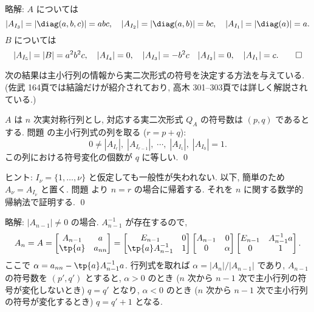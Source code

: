 \documentclass[12pt,twoside]{jarticle}
\newcommand\commentout[1]{#1}
\newcommand\commentout[1]{}
\begin{document}
\commentout{
\noindent
略解: $A$ については
\begin{equation*}
  |A_{I_3}|=|\diag(a,b,c)|=abc, \quad
  |A_{I_2}|=|\diag(a,b)|=bc, \quad
  |A_{I_1}|=|\diag(a)|=a.
\end{equation*}
$B$ については
\begin{equation*}
  |A_{I_5}|=|B|=a^2b^2c, \quad
  |A_{I_4}|=0, \quad
  |A_{I_3}|=-b^2c \quad
  |A_{I_2}|=0, \quad
  |A_{I_1}|=c.
\qed
\end{equation*}
}

\medskip

次の結果は主小行列の情報から実二次形式の符号を決定する方法を与えている.
(佐武 \cite{satake} 164頁では結論だけが紹介されており,
高木 \cite{takagi1} 301--303頁では詳しく解説されている.)

\begin{question}
\label{q:criterion-principal-minors}
  $A$ は $n$ 次実対称行列とし, 
  対応する実二次形式 $Q_A$ の符号数は $(p,q)$ であるとする.
  問題  の主小行列式の列を取る ($r=p+q$):
  \begin{equation*}
    0\ne|A_{I_r}|,\; |A_{I_{r-1}}|,\; \cdots,\; |A_{I_1}|,\; |A_{I_0}|=1.
  \end{equation*}
  この列における符号変化の個数が $q$ に等しい.
  \qed
\end{question}

\noindent
ヒント: $I_\nu=\{1,\dots,\nu\}$ と仮定しても一般性が失われない.
以下, 簡単のため $A_\nu = A_{I_\nu}$ と置く.
問題  より $n=r$ の場合に帰着する.
それを $n$ に関する数学的帰納法で証明する.
\qed

\medskip
\noindent
略解: 
$|A_{n-1}|\ne 0$ の場合. $A_{n-1}^{-1}$ が存在するので,
\begin{equation*}
  A_n = 
  A =
  \begin{bmatrix}
    A_{n-1} & a      \\
    \tp{a}  & a_{nn} \\
  \end{bmatrix}
  =
  \begin{bmatrix}
    E_{n-1}            & 0 \\
    \tp{a}A_{n-1}^{-1} & 1 \\
  \end{bmatrix}
  \begin{bmatrix}
    A_{n-1} & 0 \\
    0       & \alpha \\
  \end{bmatrix}
  \begin{bmatrix}
    E_{n-1} & A_{n-1}^{-1}a \\
      0     & 1 \\
  \end{bmatrix}.
\end{equation*}
ここで $\alpha = a_{nn} - \tp{a}A_{n-1}^{-1}a$.  
行列式を取れば $\alpha = |A_n|/|A_{n-1}|$ であり,
$A_{n-1}$ の符号数を $(p',q')$ とすると,
$\alpha>0$ のとき 
($n$ 次から $n-1$ 次で主小行列の符号が変化しないとき) $q=q'$ となり,
$\alpha<0$ のとき 
($n$ 次から $n-1$ 次で主小行列の符号が変化するとき) $q=q'+1$ となる.
\end{document}

